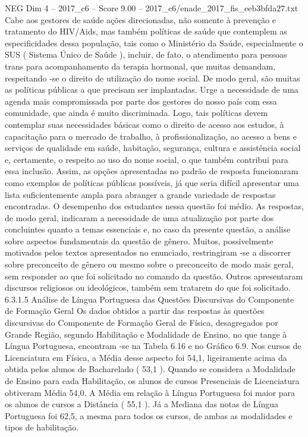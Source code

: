 \begin{textsample}{NEG Dim 4 – 2017\_c6 – Score 9.00 – 2017\_c6/enade\_2017\_fis\_eeb3bfda27.txt}
Cabe aos gestores de saúde ações direcionadas, não somente à prevenção e tratamento do HIV/Aids, mas também políticas de saúde que contemplem as especificidades dessa população, tais como o Ministério da Saúde, especialmente o SUS ( Sistema Único de Saúde ), incluir, de fato, o atendimento para pessoas trans para acompanhamento da terapia hormonal, que muitas demandam, respeitando -se o direito de utilização do nome social.
De modo geral, são muitas as políticas públicas a que precisam ser implantadas.
Urge a necessidade de uma agenda mais compromissada por parte dos gestores do nosso país com essa comunidade, que ainda é muito discriminada.
Logo, tais políticas devem contemplar suas necessidades básicas como o direito de acesso aos estudos, à capacitação para o mercado de trabalho, à profissionalização, ao acesso a bens e serviços de qualidade em saúde, habitação, segurança, cultura e assistência social e, certamente, o respeito ao uso do nome social, o que também contribui para essa inclusão.
Assim, as opções apresentadas no padrão de resposta funcionaram como exemplos de políticas públicas possíveis, já que seria difícil apresentar uma lista suficientemente ampla para abranger a grande variedade de respostas encontradas.
O desempenho dos estudantes nessa questão foi médio.
As respostas, de modo geral, indicaram a necessidade de uma atualização por parte dos concluintes quanto a temas essenciais e, no caso da presente questão, a análise sobre aspectos fundamentais da questão de gênero.
Muitos, possivelmente motivados pelos textos apresentados no enunciado, restringiram -se a discorrer sobre preconceito de gênero ou mesmo sobre o preconceito de modo mais geral, sem responder ao que foi solicitado no comando da questão.
Outros apresentaram discursos religiosos ou ideológicos, também sem tratarem do que foi solicitado. 6.3.1.5 Análise de Língua Portuguesa das Questões Discursivas do Componente de Formação Geral Os dados obtidos a partir das respostas às questões discursivas do Componente de Formação Geral de Física, desagregados por Grande Região, segundo Habilitação e Modalidade de Ensino, no que tange à Língua Portuguesa, encontram -se na Tabela 6.16 e no Gráfico 6.9.
Nos cursos de Licenciatura em Física, a Média desse aspecto foi 54,1, ligeiramente acima da obtida pelos alunos de Bacharelado ( 53,1 ).
Quando se considera a Modalidade de Ensino para cada Habilitação, os alunos de cursos Presenciais de Licenciatura obtiveram Média 54,0.
A Média em relação à Língua Portuguesa foi maior para os alunos de cursos a Distância ( 55,1 ).
Já a Mediana das notas de Língua Portuguesa foi 62,5, a mesma para todos os cursos, de ambas as modalidades e tipos de habilitação.

\end{textsample}
